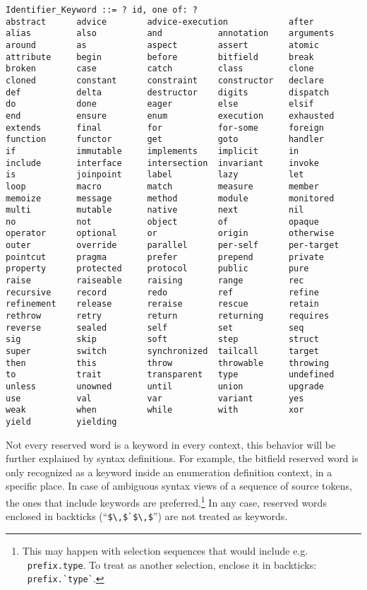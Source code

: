 \syntax\begin{lstlisting}
Identifier_Keyword ::= ? id, one of: ?
abstract      advice        advice-execution            after
alias         also          and           annotation    arguments
around        as            aspect        assert        atomic
attribute     begin         before        bitfield      break
broken        case          catch         class         clone
cloned        constant      constraint    constructor   declare
def           delta         destructor    digits        dispatch
do            done          eager         else          elsif
end           ensure        enum          execution     exhausted
extends       final         for           for-some      foreign
function      functor       get           goto          handler
if            immutable     implements    implicit      in
include       interface     intersection  invariant     invoke
is            joinpoint     label         lazy          let
loop          macro         match         measure       member
memoize       message       method        module        monitored
multi         mutable       native        next          nil
no            not           object        of            opaque
operator      optional      or            origin        otherwise
outer         override      parallel      per-self      per-target
pointcut      pragma        prefer        prepend       private
property      protected     protocol      public        pure
raise         raiseable     raising       range         rec
recursive     record        redo          ref           refine
refinement    release       reraise       rescue        retain
rethrow       retry         return        returning     requires
reverse       sealed        self          set           seq
sig           skip          soft          step          struct
super         switch        synchronized  tailcall      target
then          this          throw         throwable     throwing
to            trait         transparent   type          undefined
unless        unowned       until         union         upgrade
use           val           var           variant       yes
weak          when          while         with          xor
yield         yielding
\end{lstlisting}

Not every reserved word is a keyword in every context, this behavior will be further explained by syntax definitions. For example, the bitfield reserved word is only recognized as a keyword inside an enumeration definition context, in a specific place. In case of ambiguous syntax views of a sequence of source tokens, the ones that include keywords are preferred.\footnote{This may happen with selection sequences that would include e.g. ~\lstinline!prefix.type!. To treat  as another selection, enclose it in backticks: ~\lstinline[deletekeywords={type}]!prefix.`type`!.} In any case, reserved words enclosed in backticks (``\lstinline!$\,$`$\,$!'') are not treated as keywords. 




